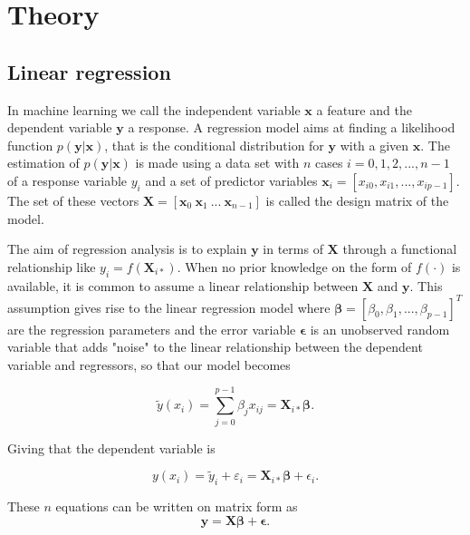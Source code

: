 

\section{Theory}
\subsection{Linear regression}
In machine learning we call the independent variable $\mathbf{x}$ a feature and the dependent variable $\mathbf{y}$ a response. A regression model aims at finding a likelihood function $p(\mathbf{y}|\mathbf{x})$, that is the conditional distribution for $\mathbf{y}$ with a given $\mathbf{x}$. The estimation of $p(\mathbf{y}|\mathbf{x})$ is made using a data set with $n$ cases $i=0,1,2,...,n-1$ of a response variable $y_i$ and a set of predictor variables $\mathbf{x}_i=[x_{i0}, x_{i1},...,x_{ip-1}]$. The set of these vectors $\mathbf{X}=[\mathbf{x}_{0}\ \mathbf{x}_{1}\ ...\ \mathbf{x}_{n-1}]$ is called the design matrix of the model. 


The aim of regression analysis is to explain $\mathbf y$ in terms of $\mathbf X$ through a functional relationship like $y_i=f(\mathbf{X}_{i*})$. When no prior knowledge on the form of $f( \cdot )$ is available, it is common to assume a linear relationship between $\mathbf{X}$ and $\mathbf{y}$. This assumption gives rise to the linear regression model where $\boldsymbol\beta=\left[\beta_0, \beta_1, ..., \beta_{p-1} \right]^T$ are the regression parameters and the error variable $\boldsymbol\epsilon$ is an unobserved random variable that adds "noise" to the linear relationship between the dependent variable and regressors, so that our model becomes

$$
\tilde{y}(x_i) = \sum_{j=0}^{p-1} \beta_j x_{ij}=\mathbf X_{i*}\boldsymbol{\beta}.
$$

Giving that the dependent variable is

$$
y(x_i) = \tilde{y}_i + \varepsilon_i = \mathbf X_{i*}\boldsymbol{\beta} + \epsilon_i.
$$

These $n$ equations can be written on matrix form as
\begin{equation}\label{eq:linear_regression}
    \mathbf{y} = \mathbf{X}\boldsymbol{\beta} + \boldsymbol{\epsilon}.
\end{equation}

